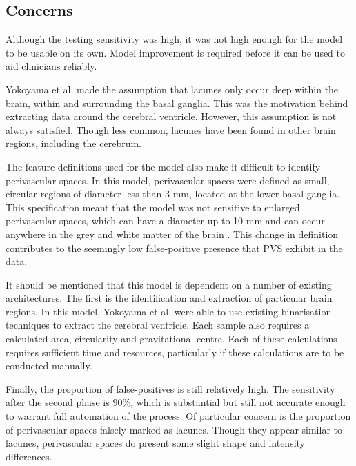 \subsection*{Concerns}

Although the testing sensitivity was high, it was not high enough for the model to be usable on its own. Model improvement is required before it can be used to aid clinicians reliably.

Yokoyama et al. made the assumption that lacunes only occur deep within the brain, within and surrounding the basal ganglia. This was the motivation behind extracting data around the cerebral ventricle. However, this assumption is not always satisfied. Though less common, lacunes have been found in other brain regions, including the cerebrum.

The feature definitions used for the model also make it difficult to identify perivascular spaces. In this model, perivascular spaces were defined as small, circular regions of diameter less than 3 mm, located at the lower basal ganglia. This specification meant that the model was not sensitive to enlarged perivascular spaces, which can have a diameter up to 10 mm and can occur anywhere in the grey and white matter of the brain \cite{WardlawJ.M.2013Nsfr}. This change in definition contributes to the seemingly low false-positive presence that PVS exhibit in the data.

It should be mentioned that this model is dependent on a number of existing architectures. The first is the identification and extraction of particular brain regions. In this model, Yokoyama et al. were able to use existing binarisation techniques to extract the cerebral ventricle. Each sample also requires a calculated area, circularity and gravitational centre. Each of these calculations requires sufficient time and resources, particularly if these calculations are to be conducted manually.

Finally, the proportion of false-positives is still relatively high. The sensitivity after the second phase is 90\%, which is substantial but still not accurate enough to warrant full automation of the process. Of particular concern is the proportion of perivascular spaces falsely marked as lacunes. Though they appear similar to lacunes, perivascular spaces do present some slight shape and intensity differences.


